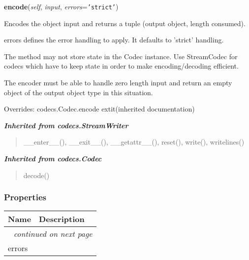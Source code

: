 \hspace{.8\funcindent}\begin{boxedminipage}{\funcwidth}

    \raggedright \textbf{encode}(\textit{self}, \textit{input}, \textit{errors}={\tt \texttt{'}\texttt{strict}\texttt{'}})

\setlength{\parskip}{2ex}
    Encodes the object input and returns a tuple (output object, length 
    consumed).

    errors defines the error handling to apply. It defaults to 'strict' 
    handling.

    The method may not store state in the Codec instance. Use StreamCodec 
    for codecs which have to keep state in order to make encoding/decoding 
    efficient.

    The encoder must be able to handle zero length input and return an 
    empty object of the output object type in this situation.

\setlength{\parskip}{1ex}
      Overrides: codecs.Codec.encode 	extit{(inherited documentation)}

    \end{boxedminipage}


\large{\textbf{\textit{Inherited from codecs.StreamWriter}}}

\begin{quote}
\_\_enter\_\_(), \_\_exit\_\_(), \_\_getattr\_\_(), reset(), write(), writelines()
\end{quote}

\large{\textbf{\textit{Inherited from codecs.Codec}}}

\begin{quote}
decode()
\end{quote}


  \subsubsection{Properties}

    \vspace{-1cm}
\hspace{\varindent}\begin{longtable}{|p{\varnamewidth}|p{\vardescrwidth}|l}
\cline{1-2}
\cline{1-2} \centering \textbf{Name} & \centering \textbf{Description}& \\
\cline{1-2}
\endhead\cline{1-2}\multicolumn{3}{r}{\small\textit{continued on next page}}\\\endfoot\cline{1-2}
\endlastfoot\raggedright e\-r\-r\-o\-r\-s\- & &\\
\cline{1-2}
\end{longtable}

